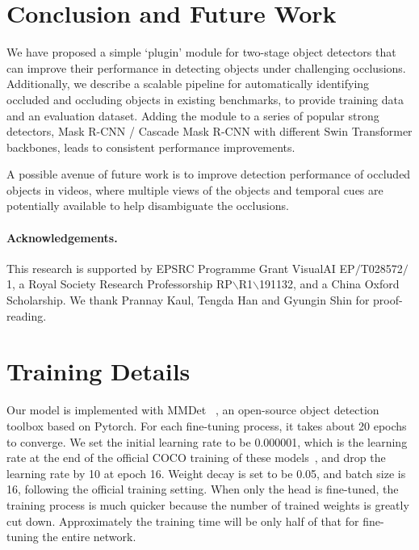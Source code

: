 \documentclass{bmvc2k}
\begin{document}
\section{Conclusion and Future Work}
\vspace{-0.1cm}

We have proposed a simple `plugin' module for two-stage object detectors that can improve their performance in detecting objects under challenging occlusions. 
Additionally, we describe a scalable pipeline for automatically identifying occluded and occluding objects in existing benchmarks, to provide training data and an evaluation dataset. Adding the module to a series of popular strong detectors, Mask R-CNN / Cascade Mask R-CNN with different Swin Transformer backbones, leads to consistent performance improvements.

A possible avenue of future work is to improve detection performance of occluded objects in videos, where multiple views of the objects and temporal cues are potentially  available to help disambiguate the occlusions. 
\paragraph{Acknowledgements. } 
This research is supported by EPSRC Programme Grant VisualAI EP$\slash$T028572$\slash$1, a Royal Society
Research Professorship RP$\backslash$R1$\backslash$191132, and a China Oxford Scholarship. 
We thank Prannay Kaul, Tengda Han and Gyungin Shin for proof-reading.



\clearpage

\appendix
\vspace{6mm}
\renewcommand{\appendixpagename}{\color{bmvc_blue} Appendix}
\appendixpage
\addappheadtotoc


\vspace{6mm}



\section{Training Details}
\label{sec:training_details}
Our model is implemented with MMDet
~\cite{mmdetection}, an open-source object detection toolbox based on Pytorch. For each fine-tuning process, it takes about 20 epochs to converge. We set the initial learning rate to be 0.000001, which is the learning rate at the end of the official COCO training of these models~\cite{swin_object_detection_github}, and drop the learning rate by 10 at epoch 16. Weight decay is set to be 0.05, and batch size is 16, following the official training setting. When only the head is fine-tuned, the training process is much quicker because the number of trained weights is greatly cut down. Approximately the training time will be only half of that for fine-tuning the entire network.
\end{document}
